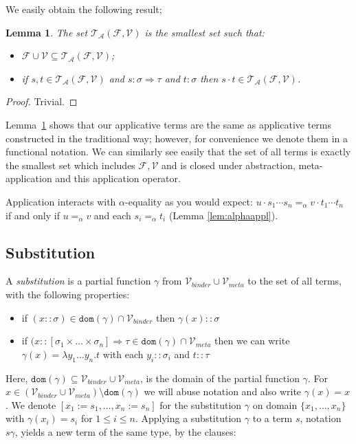 \documentclass{lmcs}
\theoremstyle{theorem}\newtheorem{theorem}{Theorem}
\theoremstyle{theorem}\newtheorem{lemma}[theorem]{Lemma}
\theoremstyle{theorem}\newtheorem{corollary}[theorem]{Corollary}
\theoremstyle{definition}\newtheorem{definition}[theorem]{Definition}
\theoremstyle{definition}\newtheorem{example}[theorem]{Example}
\newcommand{\F}{\mathcal{F}}
\newcommand{\V}{\mathcal{V}}
\newcommand{\Vmeta}{\mathcal{V}_{\mathit{meta}}}
\newcommand{\Vbound}{\mathcal{V}_{\mathit{binder}}}
\newcommand{\ATerms}{\mathcal{T}_{\mathcal{A}}}
\newcommand{\domain}{\mathtt{dom}}
\newcommand{\atype}{\sigma}
\newcommand{\btype}{\tau}
\newcommand{\avar}{x}
\newcommand{\bvar}{y}
\newcommand{\abs}[2]{\lambda #1.#2}
\newcommand{\arrtype}{\Rightarrow}
\begin{document}
We easily obtain the following result;

\begin{lemma}\label{lem:applicative_notation}
The set $\ATerms(\F,\V)$ is the smallest set such that:
\begin{itemize}
\item $\F \cup \V \subseteq \ATerms(\F,\V)$;
\item if $s,t \in \ATerms(\F,\V)$ and $s : \atype \arrtype \btype$ and $t : \atype$ then
  $s \cdot t \in \ATerms(\F,\V)$.
\end{itemize}
\end{lemma}

\begin{proof}
Trivial.
\end{proof}

Lemma~\ref{lem:applicative_notation} shows that our applicative terms are the same as applicative
terms constructed in the traditional way; however, for convenience we denote them in a functional
notation.
We can similarly see easily that the set of all terms is exactly the smallest set which includes
$\F,\V$ and is closed under abstraction, meta-application and this application operator.

Application interacts with $\alpha$-equality as you would expect: $u \cdot s_1 \cdots s_n
=_\alpha v \cdot t_1 \cdots t_n$ if and only if $u =_\alpha v$ and each $s_i =_\alpha t_i$ (Lemma
\ref{lem:alphaappl}).

\subsection{Substitution}

A \emph{substitution} is a partial function $\gamma$ from $\Vbound \cup \Vmeta$ to the set of all
terms, with the following properties:
\begin{itemize}
\item if $(\avar :: \atype) \in \domain(\gamma) \cap \Vbound$ then $\gamma(\avar) :: \atype$
\item if $(\avar :: [\atype_1 \times \dots \times \atype_n] \arrtype \btype \in \domain(\gamma)
  \cap \Vmeta$ then we can write $\gamma(\avar) = \abs{\bvar_1 \dots \bvar_n}{t}$ with
  each $\bvar_i :: \atype_i$ and $t :: \btype$
\end{itemize}
Here, $\domain(\gamma) \subseteq \Vbound \cup \Vmeta$, is the domain of the partial function
$\gamma$.  For $\avar \in (\Vbound \cup \Vmeta) \setminus \domain(\gamma)$ we will abuse notation
and also write $\gamma(\avar) = \avar$.
We denote $[\avar_1:=s_1,\dots,\avar_n:=s_n]$ for the substitution $\gamma$ on domain $\{\avar_1,
\dots,\avar_n\}$ with $\gamma(x_i) = s_i$ for $1 \leq i \leq n$.
Applying a substitution $\gamma$ to a term $s$, notation $s\gamma$, yields a new term of the same
type, by the clauses:
\end{document}
